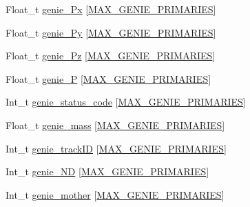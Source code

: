 \begin{DoxyCompactItemize}
\item 
Float\-\_\-t \hyperlink{classanatree_a4c2d04071d505e355abbf264e90b80ed}{genie\-\_\-\-Px} \mbox{[}\hyperlink{anatree__core__v09410002_8h_a2b21972a7445ecb7aae4c92a9c5ae1fa}{M\-A\-X\-\_\-\-G\-E\-N\-I\-E\-\_\-\-P\-R\-I\-M\-A\-R\-I\-E\-S}\mbox{]}
\item 
Float\-\_\-t \hyperlink{classanatree_a7db2f195f7ff60b2e737772876b21bb4}{genie\-\_\-\-Py} \mbox{[}\hyperlink{anatree__core__v09410002_8h_a2b21972a7445ecb7aae4c92a9c5ae1fa}{M\-A\-X\-\_\-\-G\-E\-N\-I\-E\-\_\-\-P\-R\-I\-M\-A\-R\-I\-E\-S}\mbox{]}
\item 
Float\-\_\-t \hyperlink{classanatree_a837cf311f13dab7b64c8c0975d8a7527}{genie\-\_\-\-Pz} \mbox{[}\hyperlink{anatree__core__v09410002_8h_a2b21972a7445ecb7aae4c92a9c5ae1fa}{M\-A\-X\-\_\-\-G\-E\-N\-I\-E\-\_\-\-P\-R\-I\-M\-A\-R\-I\-E\-S}\mbox{]}
\item 
Float\-\_\-t \hyperlink{classanatree_afc98530654f7ad28cdfb88b0b1abe529}{genie\-\_\-\-P} \mbox{[}\hyperlink{anatree__core__v09410002_8h_a2b21972a7445ecb7aae4c92a9c5ae1fa}{M\-A\-X\-\_\-\-G\-E\-N\-I\-E\-\_\-\-P\-R\-I\-M\-A\-R\-I\-E\-S}\mbox{]}
\item 
Int\-\_\-t \hyperlink{classanatree_a54d585c52996ce1601987a431de66f30}{genie\-\_\-status\-\_\-code} \mbox{[}\hyperlink{anatree__core__v09410002_8h_a2b21972a7445ecb7aae4c92a9c5ae1fa}{M\-A\-X\-\_\-\-G\-E\-N\-I\-E\-\_\-\-P\-R\-I\-M\-A\-R\-I\-E\-S}\mbox{]}
\item 
Float\-\_\-t \hyperlink{classanatree_a56a75507b65422e29d6eb10a30e27063}{genie\-\_\-mass} \mbox{[}\hyperlink{anatree__core__v09410002_8h_a2b21972a7445ecb7aae4c92a9c5ae1fa}{M\-A\-X\-\_\-\-G\-E\-N\-I\-E\-\_\-\-P\-R\-I\-M\-A\-R\-I\-E\-S}\mbox{]}
\item 
Int\-\_\-t \hyperlink{classanatree_ae20891e57fed156ef6a66f1269cb56f6}{genie\-\_\-track\-I\-D} \mbox{[}\hyperlink{anatree__core__v09410002_8h_a2b21972a7445ecb7aae4c92a9c5ae1fa}{M\-A\-X\-\_\-\-G\-E\-N\-I\-E\-\_\-\-P\-R\-I\-M\-A\-R\-I\-E\-S}\mbox{]}
\item 
Int\-\_\-t \hyperlink{classanatree_aa04ad329f56a1064b75721c6ba02ec32}{genie\-\_\-\-N\-D} \mbox{[}\hyperlink{anatree__core__v09410002_8h_a2b21972a7445ecb7aae4c92a9c5ae1fa}{M\-A\-X\-\_\-\-G\-E\-N\-I\-E\-\_\-\-P\-R\-I\-M\-A\-R\-I\-E\-S}\mbox{]}
\item 
Int\-\_\-t \hyperlink{classanatree_a8e1f5074bd06e73c1c4bbdd9fd9bb129}{genie\-\_\-mother} \mbox{[}\hyperlink{anatree__core__v09410002_8h_a2b21972a7445ecb7aae4c92a9c5ae1fa}{M\-A\-X\-\_\-\-G\-E\-N\-I\-E\-\_\-\-P\-R\-I\-M\-A\-R\-I\-E\-S}\mbox{]}

\end{DoxyCompactItemize}
